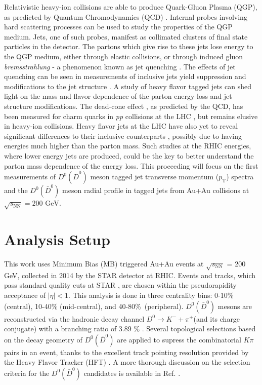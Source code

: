 \documentclass{appolb}
\begin{document}
Relativistic heavy-ion collisions are able to produce Quark-Gluon Plasma (QGP), as predicted by Quantum Chromodynamics (QCD) \cite{STARQGP}. Internal probes involving hard scattering processes can be used to study the properties of the QGP medium. Jets, one of such probes, manifest as collimated clusters of final state particles in the detector. The partons which give rise to these jets lose energy to the QGP medium, either through elastic collisions, or through induced gluon \textit{bremsstrahlung} - a phenomenon known as jet quenching \cite{ReviewJets}. The effects of jet quenching can be seen in measurements of inclusive jets yield suppression \cite{InclusiveJetRCPSTAR} and modifications to the jet structure \cite{CMSJetShape}. A study of heavy flavor tagged jets can shed light on the mass and flavor dependence of the  parton energy loss and jet structure modifications. The dead-cone effect \cite{DeadConeTheory}, as predicted by the QCD, has been measured for charm quarks in \textit{pp} collisions at the LHC \cite{DeadCone}, but remains elusive in heavy-ion collisions. Heavy flavor jets at the LHC have also yet to reveal significant differences to their inclusive counterparts \cite{bjetQuenchingCMS, CMSD0JetPaper}, possibly due to having energies much higher than the parton mass. Such studies at the RHIC energies, where lower energy jets are produced, could be the key to better understand the parton mass dependence of the energy loss. This proceeding will focus on the first measurements of $D^{0} (\bar{D}^{0})$ meson tagged jet transverse momentum ($p_{\text{T}}$) spectra and the $D^{0} (\bar{D}^{0})$ meson radial profile in tagged jets from Au+Au collisions at $\sqrt{s_{\text{NN}}} = 200 \text{ GeV}$.
\section{Analysis Setup}
This work uses Minimum Bias (MB) triggered Au+Au events at $\sqrt{s_{\text{NN}}}$ = 200 GeV, collected in 2014 by the STAR detector \cite{STAROverview} at RHIC. Events and tracks, which pass standard quality cuts at STAR \cite{STARDijetPaper}, are chosen within the pseudorapidity acceptance of $|\eta| < 1$. This analysis is done in three centrality bins: 0-10\% (central), 10-40\% (mid-central), and \mbox{40-80\% (peripheral)}.
$D^{0} (\bar{D}^{0})$ mesons are reconstructed via the hadronic decay channel $D^0 \rightarrow K^- + \pi^+$(and its charge conjugate) with a branching ratio of 3.89 \% \cite{PDG}. Several topological selections based on the decay geometry of $D^{0} (\bar{D}^{0})$ are applied to supress the combinatorial $K\pi$ pairs in an event, thanks to the excellent track pointing resolution provided by the Heavy Flavor Tracker (HFT) \cite{HFT}. A more thorough discussion on the selection criteria for the $D^{0} (\bar{D}^{0})$ candidates is available in Ref. \cite{STARD0PaperAuAu}.
\end{document}
